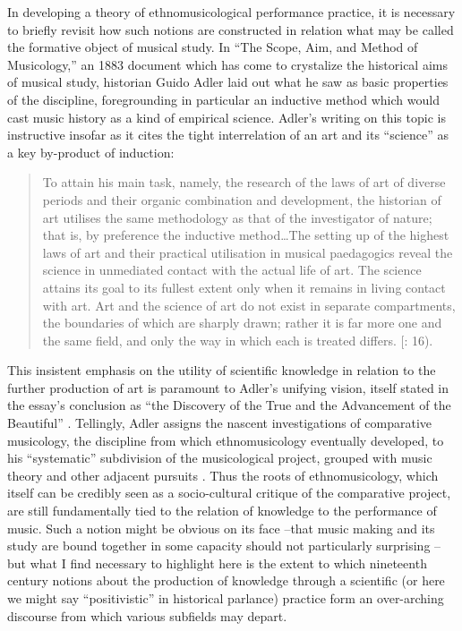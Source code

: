 In developing a theory of ethnomusicological performance practice, it is
necessary to briefly revisit how such notions are constructed in
relation what may be called the formative object of musical study. In
``The Scope, Aim, and Method of Musicology,'' an 1883 document which has
come to crystalize the historical aims of musical study, historian Guido
Adler laid out what he saw as basic properties of the discipline,
foregrounding in particular an inductive method which would cast music
history as a kind of empirical science. Adler's writing on this topic is
instructive insofar as it cites the tight interrelation of an art and
its ``science'' as a key by-product of induction:

\begin{quote}
To attain his main task, namely, the research of the laws of art of
diverse periods and their organic combination and development, the
historian of art utilises the same methodology as that of the
investigator of nature; that is, by preference the inductive
method\ldots The setting up of the highest laws of art and their
practical utilisation in musical paedagogics reveal the science in
unmediated contact with the actual life of art. The science attains its
goal to its fullest extent only when it remains in living contact with
art. Art and the science of art do not exist in separate compartments,
the boundaries of which are sharply drawn; rather it is far more one and
the same field, and only the way in which each is treated differs.
{[}\textcite{mugglestone_guido_1983}: 16).
\end{quote}

This insistent emphasis on the utility of scientific knowledge in
relation to the further production of art is paramount to Adler's
unifying vision, itself stated in the essay's conclusion as ``the
Discovery of the True and the Advancement of the Beautiful''
\autocite[16]{mugglestone_guido_1983}. Tellingly, Adler assigns the
nascent investigations of comparative musicology, the discipline from
which ethnomusicology eventually developed, to his ``systematic''
subdivision of the musicological project, grouped with music theory and
other adjacent pursuits \autocite[13]{mugglestone_guido_1983}. Thus the
roots of ethnomusicology, which itself can be credibly seen as a
socio-cultural critique of the comparative project, are still
fundamentally tied to the relation of knowledge to the performance of
music. Such a notion might be obvious on its face --that music making
and its study are bound together in some capacity should not
particularly surprising -- but what I find necessary to highlight here
is the extent to which nineteenth century notions about the production
of knowledge through a scientific (or here we might say ``positivistic''
in historical parlance) practice form an over-arching discourse from
which various subfields may depart.

